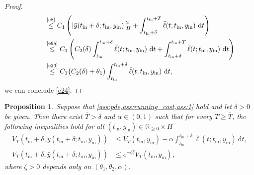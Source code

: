 \documentclass{m2an}
\def\R{\mathbb{R}}
\newcommand{\dt}{\mathrm{d}t}
\newcommand{\tint}{t_{\mathrm{in}}}
\newcommand{\yint}{y_{\mathrm{in}}}
\newcommand{\norm}[2]{\left|#1\right|_{#2}}
\newtheorem{proposition}[thrm]{Proposition}
\begin{document}
\begin{proof}
\begin{align*}
        &\hspace{10mm}\stackrel{\text{\eqref{e8}}}{\leq} C_1 \left(   \norm{\bar y(\tint+\delta ;\tint, \yint)}{H}^2+\int^{\tint+T}_{\tint+\delta}\bar \ell(t;\tint, \yint)\ \dt \right)\\
        &\hspace{10mm}\stackrel{\text{\eqref{e8a}}}{\leq}  C_1  \left( C_2(\delta)\int_{\tint}^{\tint+\delta}\bar \ell(t;\tint, \yint)\ \dt +\int^{\tint+T}_{\tint+\delta}\bar\ell(t;\tint, \yint)\ \dt    \right) \\
        &\hspace{10mm}\stackrel{\text{\eqref{e23}}}{\leq}  C_1\big(C_2(\delta)+\theta_1\big)\int_{\tint}^{\tint+\delta}\bar \ell(t;\tint, \yint)\ \dt,
    \end{align*}
    we can conclude  \eqref{e24}.
\end{proof}
%
\begin{proposition}\label{pro1}
    Suppose that \cref{ass:pde,ass:running_cost,ass:1} hold and let $\delta>0$ be given. Then there exist  $\bar T>\delta$ and $\alpha \in (0,1)$ such that for every $T\geq \bar T$, the following inequalities hold for all $(\tint, \yint) \in  \R_{\geq 0} \times H$
    \begin{align}
    \label{e20s}
    V_T(\tint+\delta ,\bar y(\tint+\delta;\tint, \yint)) &\leq V_T(\tint, \yint)-\alpha \int_{\tint}^{\tint+\delta} \bar\ell(t;\tint, \yint)\ \dt, \\\label{e20e}
    V_T(\tint+\delta ,\bar y(\tint+\delta;\tint, \yint)) &\leq e^{-\zeta \delta} V_T(\tint, \yint),
    \end{align}
    where $\zeta>0$ depends only on $(\theta_1,\theta_2,\alpha)$. 
\end{proposition}
%
\end{document}
